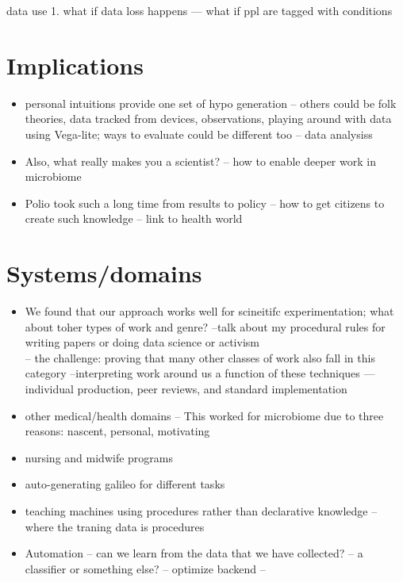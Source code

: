 data use
1. what if data loss happens — what if ppl are tagged with conditions 




\section{Implications}
\begin{itemize}
\item personal intuitions provide one set of hypo generation -- others could be folk theories, data tracked from devices, observations, playing around with data using Vega-lite; ways to evaluate could be different too -- data analysiss
\item Also, what really makes you a scientist? -- how to enable deeper work in microbiome
\item Polio took such a long time from results to policy --  how to get citizens to create such knowledge -- link to health world
\end{itemize}


\section{Systems/domains} 

\begin{itemize}
\item We found that our approach works well for scineitifc experimentation; what about toher types of work and genre?
--talk about my procedural rules for writing papers or doing data science or activism \\
-- the challenge: proving that many other classes of work also fall in this category
--interpreting work around us a function of these techniques — individual production, peer reviews, and standard implementation
\item other medical/health domains -- This worked for microbiome due to three reasons: nascent, personal, motivating 
\item nursing and midwife programs
\item auto-generating galileo for different tasks
\item teaching machines using procedures rather than declarative knowledge -- where the traning data is procedures
\item Automation -- can we learn from the data that we have collected? -- a classifier or something else? -- optimize backend -- 
\end{itemize}

